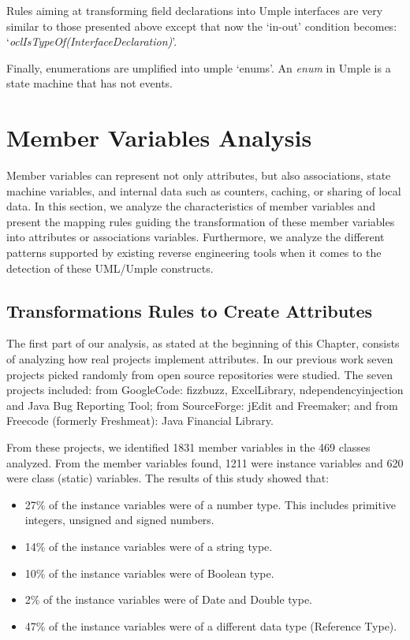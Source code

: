 Rules aiming at transforming field declarations into Umple interfaces are very similar to those presented above except that now the `in-out' condition becomes: 
\newline
`\textit{oclIsTypeOf(InterfaceDeclaration)}'.

Finally, enumerations are umplified into umple `enums'. An \textit{enum} in Umple is a state machine that has not events.

\section{Member Variables Analysis}
Member variables can represent not only attributes, but also associations, state machine variables, and internal data such as counters, caching, or sharing of local data. In this section, we analyze the characteristics of member variables and present the mapping rules guiding the transformation of
these member variables into attributes or associations variables. Furthermore, we analyze the different patterns supported by existing reverse engineering tools when it comes to the detection of these UML/Umple constructs. 

\subsection{Transformations Rules to Create Attributes}

The first part of our analysis, as stated at the beginning of this Chapter, consists of analyzing how real projects implement attributes. In our previous work \cite{UmpleAttributes} seven projects picked randomly from open source repositories were studied. The seven projects included: from GoogleCode: fizzbuzz, ExcelLibrary, ndependencyinjection and Java Bug Reporting Tool; from SourceForge: jEdit and Freemaker; and from Freecode (formerly Freshmeat): Java Financial Library.

From these projects, we identified 1831 member variables in the 469 classes analyzed. From the member variables found, 1211 were instance variables and 620 were class (static) variables. The results of this study showed that:

\begin{itemize}
\item 27\% of the instance variables were of a number type. This includes primitive integers, unsigned and signed numbers.
\item 14\% of the instance variables were of a string type. 
\item 10\% of the instance variables were of Boolean type.
\item 2\% of the instance variables were of Date and Double type.
\item 47\% of the instance variables were of a different data type (Reference Type).
\end{itemize}

